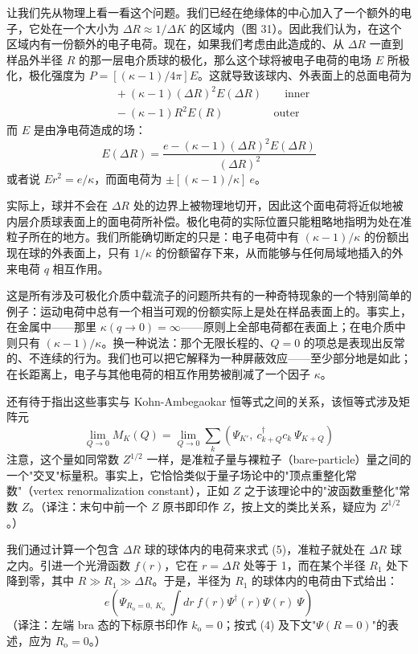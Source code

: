让我们先从物理上看一看这个问题。我们已经在绝缘体的中心加入了一个额外的电子，它处在一个大小为 $\Delta R\approx 1/\Delta K$ 的区域内（图 31）。因此我们认为，在这个区域内有一份额外的电子电荷。现在，如果我们考虑由此造成的、从 $\Delta R$ 一直到样品外半径 $R$ 的那一层电介质球的极化，那么这个球将被电子电荷的电场 $E$ 所极化，极化强度为 $P=[(\kappa-1)/4\pi]E$。这就导致该球内、外表面上的总面电荷为
\begin{align*}
&+\ (\kappa-1)(\Delta R)^{2}E(\Delta R)\qquad\text{inner}\\
&-\ (\kappa-1)R^{2}E(R)\qquad\qquad\ \ \text{outer}
\end{align*}
而 $E$ 是由净电荷造成的场：
\begin{equation*}
E(\Delta R) = \frac{e-(\kappa-1)(\Delta R)^{2}E(\Delta R)}{(\Delta R)^{2}}
\end{equation*}
或者说 $Er^{2}=e/\kappa$，而面电荷为 $\pm[(\kappa-1)/\kappa]\ e$。


实际上，球并不会在 $\Delta R$ 处的边界上被物理地切开，因此这个面电荷将近似地被内层介质球表面上的面电荷所补偿。极化电荷的实际位置只能粗略地指明为处在准粒子所在的地方。我们所能确切断定的只是：电子电荷中有 $(\kappa-1)/\kappa$ 的份额出现在球的外表面上，只有 $1/\kappa$ 的份额留存下来，从而能够与任何局域地插入的外来电荷 $q$ 相互作用。

这是所有涉及可极化介质中载流子的问题所共有的一种奇特现象的一个特别简单的例子：运动电荷中总有一个相当可观的份额实际上是处在样品表面上的。事实上，在金属中——那里 $\kappa(q\to 0)=\infty$——原则上全部电荷都在表面上；在电介质中则只有 $(\kappa-1)/\kappa$。换一种说法：那个无限长程的、$Q=0$ 的项总是表现出反常的、不连续的行为。我们也可以把它解释为一种屏蔽效应——至少部分地是如此；在长距离上，电子与其他电荷的相互作用势被削减了一个因子 $\kappa$。

还有待于指出这些事实与 Kohn-Ambegaokar 恒等式之间的关系，该恒等式涉及矩阵元
\begin{equation*}
\lim_{Q\to 0}M_{K}(Q) = \lim_{Q\to 0}\sum_{k}\left(\Psi_{K'},\ c^{\dagger}_{k+Q}c_{k}\ \Psi_{K+Q}\right) \tag{5}
\end{equation*}
注意，这个量如同常数 $Z^{1/2}$ 一样，是准粒子量与裸粒子（bare-particle）量之间的一个"交叉"标量积。事实上，它恰恰类似于量子场论中的"顶点重整化常数"（vertex renormalization constant），正如 $Z$ 之于该理论中的"波函数重整化"常数 $Z$。（译注：末句中前一个 $Z$ 原书即印作 $Z$，按上文的类比关系，疑应为 $Z^{1/2}$。）

我们通过计算一个包含 $\Delta R$ 球的球体内的电荷来求式 (5)，准粒子就处在 $\Delta R$ 球之内。引进一个光滑函数 $f(r)$，它在 $r=\Delta R$ 处等于 1，而在某个半径 $R_{1}$ 处下降到零，其中 $R\gg R_{1}\gg\Delta R$。于是，半径为 $R_{1}$ 的球体内的电荷由下式给出：
\begin{equation*}
e\left(\Psi_{R_{\mathrm{o}}=0,\ K_{\mathrm{o}}}\ \int dr\ f(r)\Psi^{\dagger}(r)\Psi(r)\ \Psi\right) \tag{6}
\end{equation*}
（译注：左端 bra 态的下标原书印作 $k_{\mathrm{o}}=0$；按式 (4) 及下文"$\Psi(R=0)$"的表述，应为 $R_{\mathrm{o}}=0$。）

